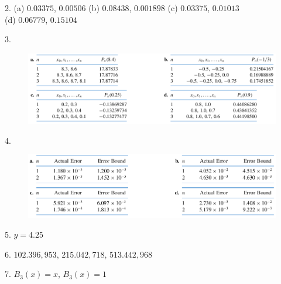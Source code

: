 \documentclass{article}
\begin{document}
\noindent{}2. (a) $0.03375$, $0.00506$ (b) $0.08438$, $0.001898$ (c) $0.03375$,
$0.01013$ \\(d) $0.06779$, $0.15104$

\noindent{}3. 
\begin{figure}[!h]
	\includegraphics[width=\textwidth]{ex3.png}
\end{figure}
\newpage{}

\noindent{}4.
\begin{figure}[!h]
	\includegraphics[width=\textwidth]{ex4.png}
\end{figure}

\noindent{}5. $y=4.25$

\noindent{}6. $102.396,953$, $215.042,718$, $513.442,968$

\noindent{}7. $B_3(x) = x$, $B_3(x) = 1$
\end{document}
